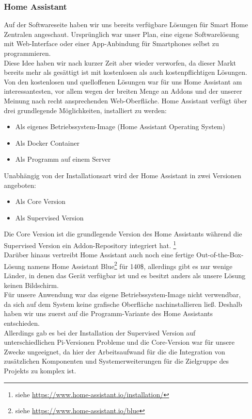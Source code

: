 \subsubsection{Home Assistant}\label{hwg_software_homeassistant}
Auf der Softwareseite haben wir uns bereits verfügbare Lösungen für Smart Home Zentralen angeschaut. 
Ursprünglich war unser Plan, eine eigene Softwarelösung mit Web-Interface oder einer App-Anbindung für Smartphones selbst zu programmieren.\\
\noindent Diese Idee haben wir nach kurzer Zeit aber wieder verworfen, da dieser Markt bereits mehr als gesättigt ist mit kostenlosen als auch kostenpflichtigen Lösungen. 
Von den kostenlosen und quelloffenen Lösungen war für uns Home Assistant am interessantesten, vor allem wegen der breiten Menge an Addons und der unserer Meinung nach recht ansprechenden Web-Oberfläche.
Home Assistant verfügt über drei grundlegende Möglichkeiten, installiert zu werden:
\begin{itemize}
    \item Als eigenes Betriebssystem-Image (Home Assistant Operating System)
    \item Als Docker Container
    \item Als Programm auf einem Server
\end{itemize}
Unabhängig von der Installationsart wird der Home Assistant in zwei Versionen angeboten:
\begin{itemize}
    \item Als Core Version
    \item Als Supervised Version
\end{itemize}
Die Core Version ist die grundlegende Version des Home Assistants während die Supervised Version ein Addon-Repository integriert hat. \footnote{siehe \url{https://www.home-assistant.io/installation/}}\\
\noindent Darüber hinaus vertreibt Home Assistant auch noch eine fertige Out-of-the-Box-Lösung namens Home Assistant Blue\footnote{siehe \url{https://www.home-assistant.io/blue}} für 140\$, allerdings gibt es nur wenige Länder, in denen das Gerät verfügbar ist und es besitzt anders als unsere Lösung keinen Bildschirm.\\
\noindent Für unsere Anwendung war das eigene Betriebssystem-Image nicht verwendbar, da sich auf dem System keine grafische Oberfläche nachinstallieren ließ. 
Deshalb haben wir uns zuerst auf die Programm-Variante des Home Assistants entschieden.\\
\noindent Allerdings gab es bei der Installation der Supervised Version auf unterschiedlichen Pi-Versionen Probleme und die Core-Version war für unsere Zwecke ungeeignet, da hier der Arbeitsaufwand für die die Integration von zusätzlichen Komponenten und Systemerweiterungen für die Zielgruppe des Projekts zu komplex ist. 
